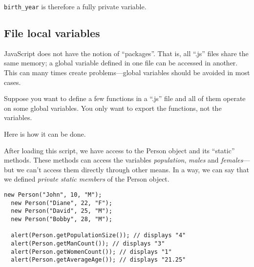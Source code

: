 \lstinline{birth_year} is therefore a fully private variable.

\subsection{File local variables}

JavaScript does not have the notion of “packages”.  That is, all “.js” files
share the same memory; a global variable defined in one file can be accessed
in another.  This can many times create problems—global variables should be
avoided in most cases.

Suppose you want to define a few functions in a “.js” file and all of them
operate on some global variables.  You only want to export the functions, not
the variables.

Here is how it can be done.



After loading this script, we have access to the Person object and its
“static” methods.  These methods can access the variables \textit{population},
\textit{males} and \textit{females}—but we can't access them directly through
other means.  In a way, we can say that we defined \emph{private static
  members} of the Person object.

\begin{lstlisting}[nolol]
  new Person("John", 10, "M");
  new Person("Diane", 22, "F");
  new Person("David", 25, "M");
  new Person("Bobby", 28, "M");

  alert(Person.getPopulationSize()); // displays "4"
  alert(Person.getManCount()); // displays "3"
  alert(Person.getWomenCount()); // displays "1"
  alert(Person.getAverageAge()); // displays "21.25"
\end{lstlisting}

